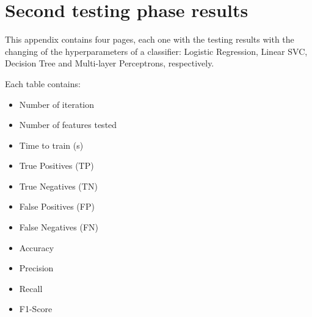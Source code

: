 \documentclass[journal]{IEEEtran}
\begin{document}










\section{Second testing phase results}
\label{AppB}
This appendix contains four pages, each one with the testing results with the changing of the hyperparameters of a classifier: Logistic Regression, Linear SVC, Decision Tree and Multi-layer Perceptrons, respectively.

Each table contains:
\begin{itemize}
\item Number of iteration
\item Number of features tested
\item Time to train (s)
\item True Positives (TP)
\item True Negatives (TN)
\item False Positives (FP)
\item False Negatives (FN)
\item Accuracy
\item Precision
\item Recall
\item F1-Score
\end{itemize}

\clearpage







\end{document}
